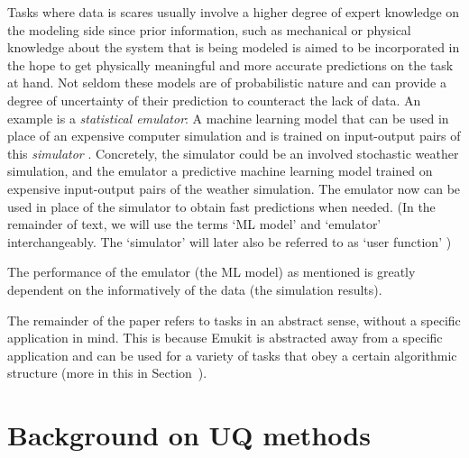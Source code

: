 Tasks where data is scares usually involve a higher degree of expert knowledge on the modeling side since prior information, such as mechanical or physical knowledge about the system that is being modeled is aimed to be incorporated in the hope to get physically meaningful and more accurate predictions on the task at hand. Not seldom these models are of probabilistic nature and can provide a degree of uncertainty of their prediction to counteract the lack of data.  An example is a \emph{statistical emulator}: A machine learning model that can be used in place of an expensive computer simulation and is trained on input-output pairs of this \emph{simulator} . Concretely, the simulator could be an involved stochastic weather simulation, and the emulator a predictive machine learning model trained on expensive input-output pairs of the weather simulation. The emulator now can be used in place of the simulator to obtain fast predictions when needed. (In the remainder of text, we will use the terms `ML model' and `emulator' interchangeably. The `simulator' will later also be referred to as `user function' )

The performance of the emulator (the ML model) as mentioned is greatly dependent on the informatively of the data (the simulation results).



The remainder of the paper refers to tasks in an abstract sense, without a specific application in mind. This is because Emukit is abstracted away from a specific application and can be used for a variety of tasks that obey a certain algorithmic structure (more in this in Section~). 

\section{Background on UQ methods}

